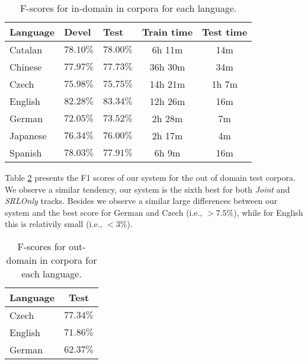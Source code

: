 \begin{table}
\begin{center}
\small
\begin{tabular}{|l|l|l|c|c|}\hline
Language           & Devel        & Test       & Train time  & Test time  
\\\hline\hline
Catalan         & $78.10\%$    & $78.00\%$  & 6h 11m  & 14m   \\ %
Chinese         & $77.97\%$    & $77.73\%$  & 36h 30m & 34m   \\ %
Czech           & $75.98\%$    & $75.75\%$  & 14h 21m & 1h 7m \\ %
English         & $82.28\%$    & $83.34\%$  & 12h 26m & 16m   \\ %
German          & $72.05\%$    & $73.52\%$  & 2h 28m  & 7m    \\ %
Japanese        & $76.34\%$    & $76.00\%$  & 2h 17m  & 4m    \\ %
Spanish         & $78.03\%$    & $77.91\%$  & 6h 9m   & 16m   \\ %
\hline
\end{tabular}
\caption{F-scores for in-domain in corpora for each language.}
\label{tbl:results}
\normalsize
\end{center}
\end{table}

Table \ref{tbl:outresults} presents the F1 scores of our system for the out of 
domain test corpora. We observe a similar tendency, our system is the sixth best 
for both \emph{Joint} and \emph{SRLOnly} tracks. Besides we observe a similar 
large differences between our system and the best score for German and Czech 
(i.e., $>7.5\%$), while for English this is relativily small (i.e., $<3\%$). 

\begin{table}
\begin{center}
\small
\begin{tabular}{|l|c|}\hline
Language        & Test       \\\hline\hline
Czech           & $77.34\%$  \\
English         & $71.86\%$  \\
German          & $62.37\%$  \\
\hline
\end{tabular}
\caption{F-scores for out-domain in corpora for each language.}
\label{tbl:outresults}
\normalsize
\end{center}
\end{table}


